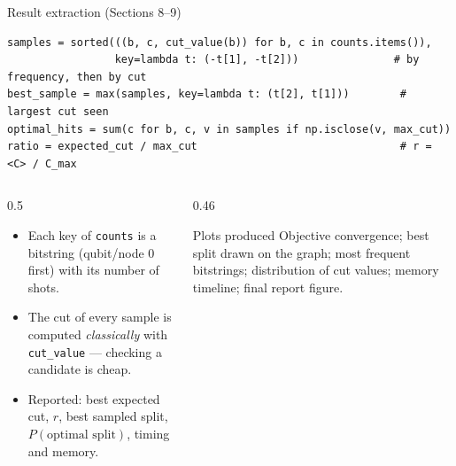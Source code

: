\documentclass[aspectratio=169,11pt]{beamer}
\begin{document}
\begin{frame}[fragile]{Result extraction (Sections 8--9)}
\begin{lstlisting}
samples = sorted(((b, c, cut_value(b)) for b, c in counts.items()),
                 key=lambda t: (-t[1], -t[2]))               # by frequency, then by cut
best_sample = max(samples, key=lambda t: (t[2], t[1]))        # largest cut seen
optimal_hits = sum(c for b, c, v in samples if np.isclose(v, max_cut))
ratio = expected_cut / max_cut                                # r = <C> / C_max
\end{lstlisting}
  \begin{columns}[T]
    \begin{column}{0.5\textwidth}
      \small
      \begin{itemize}
        \item Each key of \texttt{counts} is a bitstring (qubit/node 0 first) with its number of shots.
        \item The cut of every sample is computed \emph{classically} with \texttt{cut\_value} --- checking a candidate is cheap.
        \item Reported: best expected cut, $r$, best sampled split, $P(\text{optimal split})$, timing and memory.
      \end{itemize}
    \end{column}
    \begin{column}{0.46\textwidth}
      \begin{block}{Plots produced}
        \small Objective convergence; best split drawn on the graph; most frequent bitstrings; distribution of
        cut values; memory timeline; final report figure.
      \end{block}
    \end{column}
  \end{columns}
\end{frame}
\end{document}
